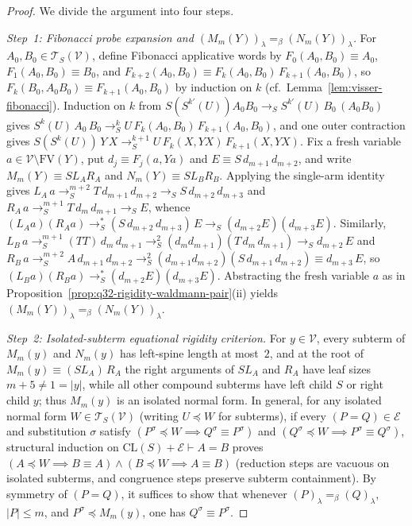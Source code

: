 \documentclass[11pt,reqno]{amsart}
\numberwithin{equation}{section}
\theoremstyle{plain}
\theoremstyle{definition}
\theoremstyle{remark}
\newcommand{\CLS}{\mathrm{CL}(S)}
\newcommand{\TSV}{\mathcal{T}_S(\mathcal{V})}
\newcommand{\redS}{\to_S}
\newcommand{\redSs}{\to_S^*}
\begin{document}
\begin{proof}
We divide the argument into four steps.

\emph{Step~1: Fibonacci probe expansion and $(M_m(Y))_\lambda =_\beta (N_m(Y))_\lambda$.} For $A_0, B_0 \in \TSV$, define Fibonacci applicative words by $F_0(A_0, B_0) \equiv A_0$, $F_1(A_0, B_0) \equiv B_0$, and $F_{k+2}(A_0, B_0) \equiv F_k(A_0, B_0)\,F_{k+1}(A_0, B_0)$, so $F_k(B_0, A_0 B_0) \equiv F_{k+1}(A_0, B_0)$ by induction on $k$ (cf.\ Lemma~\ref{lem:visser-fibonacci}). Induction on $k$ from $S(S^{k'}(U)) A_0 B_0 \redS S^{k'}(U)\,B_0\,(A_0 B_0)$ gives $S^k(U)\,A_0\,B_0 \redS^k U\,F_k(A_0, B_0)\,F_{k+1}(A_0, B_0)$, and one outer contraction gives $S(S^k(U))\,Y\,X \redS^{k+1} U\,F_k(X, Y X)\,F_{k+1}(X, Y X)$. Fix a fresh variable $a \in \mathcal{V} \setminus \mathrm{FV}(Y)$, put $d_j \equiv F_j(a, Y a)$ and $E \equiv S\,d_{m+1}\,d_{m+2}$, and write $M_m(Y) \equiv S L_A R_A$ and $N_m(Y) \equiv S L_B R_B$. Applying the single-arm identity gives $L_A\,a \redS^{m+2} T\,d_{m+1}\,d_{m+2} \redS S\,d_{m+2}\,d_{m+3}$ and $R_A\,a \redS^{m+1} T\,d_m\,d_{m+1} \redS E$, whence $(L_A a)(R_A a) \redSs (S\,d_{m+2}\,d_{m+3})\,E \redS (d_{m+2} E)(d_{m+3} E)$. Similarly, $L_B\,a \redS^{m+1} (T T)\,d_m\,d_{m+1} \redS^2 (d_m d_{m+1})(T\,d_m\,d_{m+1}) \redS d_{m+2}\,E$ and $R_B\,a \redS^{m+2} A\,d_{m+1}\,d_{m+2} \redS^2 (d_{m+1} d_{m+2})(S\,d_{m+1}\,d_{m+2}) \equiv d_{m+3}\,E$, so $(L_B a)(R_B a) \redSs (d_{m+2} E)(d_{m+3} E)$. Abstracting the fresh variable $a$ as in Proposition~\ref{prop:q32-rigidity-waldmann-pair}(ii) yields $(M_m(Y))_\lambda =_\beta (N_m(Y))_\lambda$.

\emph{Step~2: Isolated-subterm equational rigidity criterion.} For $y \in \mathcal{V}$, every subterm of $M_m(y)$ and $N_m(y)$ has left-spine length at most~$2$, and at the root of $M_m(y) \equiv (S L_A)\,R_A$ the right arguments of $S L_A$ and $R_A$ have leaf sizes $m + 5 \ne 1 = |y|$, while all other compound subterms have left child $S$ or right child $y$; thus $M_m(y)$ is an isolated normal form. In general, for any isolated normal form $W \in \TSV$ (writing $U \preceq W$ for subterms), if every $(P = Q) \in \mathcal{E}$ and substitution $\sigma$ satisfy $(P^\sigma \preceq W \implies Q^\sigma \equiv P^\sigma)$ and $(Q^\sigma \preceq W \implies P^\sigma \equiv Q^\sigma)$, structural induction on $\CLS + \mathcal{E} \vdash A = B$ proves $(A \preceq W \implies B \equiv A) \land (B \preceq W \implies A \equiv B)$ (reduction steps are vacuous on isolated subterms, and congruence steps preserve subterm containment). By symmetry of $(P = Q)$, it suffices to show that whenever $(P)_\lambda =_\beta (Q)_\lambda$, $|P| \le m$, and $P^\sigma \preceq M_m(y)$, one has $Q^\sigma \equiv P^\sigma$.


\end{proof}
\end{document}
